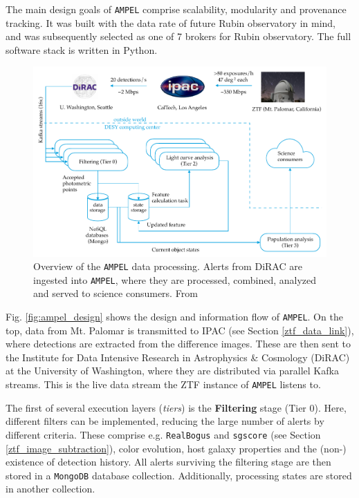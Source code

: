 \documentclass[
    a4paper, %
    fontsize=10pt, %
    twoside=true, %
    numbers=noenddot, %
    fontmethod=tex,
]{kaobook}
\begin{document}
The main design goals of \texttt{AMPEL} comprise scalability, modularity and provenance tracking. It was built with the data rate of future Rubin observatory  in mind, and was subsequently selected as one of 7 brokers for Rubin observatory. The full software stack is written in Python.


\begin{figure}[h!]
    \includegraphics{fu/ampel_design.pdf}
    \caption[\texttt{AMPEL} overview]{Overview of the \texttt{AMPEL} data processing. Alerts from DiRAC are ingested into \texttt{AMPEL}, where they are processed, combined, analyzed and served to science consumers. From \cite{Nordin2019}}
\end{figure}

Fig. \ref{fig:ampel_design} shows the design and information flow of \texttt{AMPEL}. On the top, data from Mt. Palomar is transmitted to IPAC (see Section \ref{ztf_data_link}), where detections are extracted from the difference images. These are then sent to the Institute for Data Intensive Research in Astrophysics \& Cosmology (DiRAC) at the University of Washington, where they are distributed via parallel Kafka streams. This is the live data stream the ZTF instance of \texttt{AMPEL} listens to.

The first of several execution layers (\textit{tiers}) is the \textbf{Filtering} stage (Tier 0). Here, different filters can be implemented, reducing the large number of alerts by different criteria. These comprise e.g. \texttt{RealBogus} and \texttt{sgscore} (see Section \ref{ztf_image_subtraction}), color evolution, host galaxy properties and the (non-) existence of detection history. All alerts surviving the filtering stage are then stored in a \texttt{MongoDB} database collection. Additionally, processing states are stored in another collection.
\end{document}

